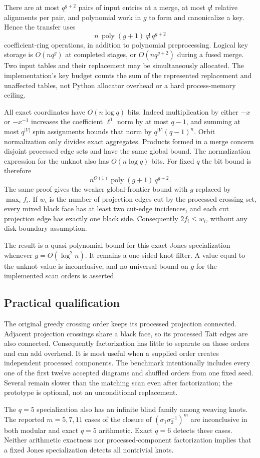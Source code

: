 There are at most $q^{g+2}$ pairs of input entries at a merge, at most
$q!$ relative alignments per pair, and polynomial work in $g$ to form and
canonicalize a key.  Hence the transfer uses
\[
 n\,\operatorname{poly}(g+1)\,q!\,q^{g+2}
\]
coefficient-ring operations, in addition to polynomial preprocessing.
Logical key storage is $O(nq^g)$ at completed stages, or
$O(nq^{g+2})$ during a fused merge.  Two input tables and their replacement
may be simultaneously allocated.  The implementation's key budget counts
the sum of the represented replacement and unaffected tables, not Python
allocator overhead or a hard process-memory ceiling.

All exact coordinates have $O(n\log q)$ bits.  Indeed multiplication by
either $-x$ or $-x^{-1}$ increases the coefficient $\ell^1$ norm by at most
$q-1$, and summing at most $q^{|V|}$ spin assignments bounds that norm by
$q^{|V|}(q-1)^n$.  Orbit normalization only divides exact aggregates.
Products formed in a merge concern disjoint processed edge sets and have
the same global bound.  The normalization expression for the unknot also
has $O(n\log q)$ bits.  For fixed $q$ the bit bound is therefore
\[
 n^{O(1)}\operatorname{poly}(g+1)\,q^{g+2}.
\]
The same proof gives the weaker global-frontier bound with $g$ replaced
by $\max_i f_i$.  If $w_i$ is the number of projection edges cut by the
processed crossing set, every mixed black face has at least two cut-edge
incidences, and each cut projection edge has exactly one black side.
Consequently $2f_i\le w_i$, without any disk-boundary assumption.

The result is a quasi-polynomial bound for this exact Jones specialization
whenever $g=O(\log^2 n)$.  It remains a one-sided knot filter.  A value
equal to the unknot value is inconclusive, and no universal bound on $g$
for the implemented scan orders is asserted.

\subsection{Practical qualification}
The original greedy crossing order keeps its processed projection
connected.  Adjacent projection crossings share a black face, so its
processed Tait edges are also connected.  Consequently factorization has
little to separate on those orders and can add overhead.  It is most
useful when a supplied order creates independent processed components.
The benchmark intentionally includes every one of the first twelve
accepted diagrams and shuffled orders from one fixed seed.  Several
remain slower than the matching scan even after factorization; the
prototype is optional, not an unconditional replacement.

The $q=5$ specialization also has an infinite blind family among weaving
knots.  The reported $m=5,7,11$ cases of the closure of
$(\sigma_1\sigma_2^{-1})^m$ are inconclusive in both modular and exact
$q=5$ arithmetic.  Exact $q=6$ detects these cases.  Neither arithmetic
exactness nor processed-component factorization implies that a fixed
Jones specialization detects all nontrivial knots.
